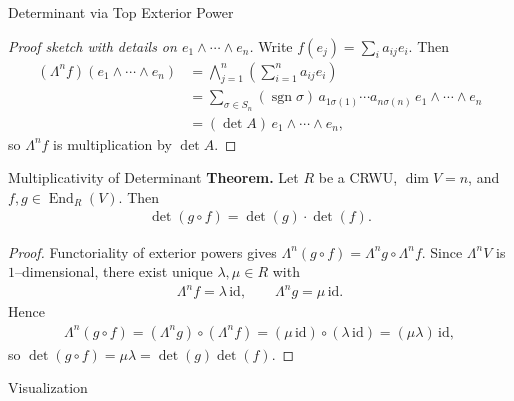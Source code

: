 \begin{frame}{Determinant via Top Exterior Power}
\begin{proof}[Proof sketch with details on $e_1\wedge\!\cdots\!\wedge e_n$]
Write $f(e_j)=\sum_{i}a_{ij}e_i$. Then
\begin{align*}
(\Lambda^n f)(e_1\wedge\cdots\wedge e_n)
&=\bigwedge_{j=1}^n\left(\sum_{i=1}^n a_{ij}e_i\right)\\
&
= \sum_{\sigma\in S_n}\!\left(\operatorname{sgn}\sigma\right)\, a_{1\sigma(1)}\cdots a_{n\sigma(n)} \, e_1\wedge\cdots\wedge e_n\\
&=(\det A)\, e_1\wedge\cdots\wedge e_n,
\end{align*}
so $\Lambda^n f$ is multiplication by $\det A$.
\end{proof}
\end{frame}

\begin{frame}{Multiplicativity of Determinant}
\textbf{Theorem.}
Let $R$ be a CRWU, $\dim V=n$, and $f,g\in\operatorname{End}_R(V)$. Then
\begin{align*}
\det(g\circ f)=\det(g)\cdot \det(f).
\end{align*}
\vspace{-0.6cm}
\begin{proof}
Functoriality of exterior powers gives $\Lambda^{n}(g\circ f)=\Lambda^{n}g\circ \Lambda^{n}f$. Since $\Lambda^{n}V$ is $1$–dimensional, there exist unique $\lambda,\mu\in R$ with
\begin{align*}
\Lambda^{n}f=\lambda\,\mathrm{id},\qquad \Lambda^{n}g=\mu\,\mathrm{id}.
\end{align*}
Hence
\begin{align*}
\Lambda^{n}(g\circ f)=(\Lambda^{n}g)\circ(\Lambda^{n}f)=(\mu\,\mathrm{id})\circ(\lambda\,\mathrm{id})=(\mu\lambda)\,\mathrm{id},
\end{align*}
so $\det(g\circ f)=\mu\lambda=\det(g)\det(f)$.
\end{proof}
\end{frame}

\begin{frame}{Visualization}
\begin{center}
\end{center}
\end{frame}

